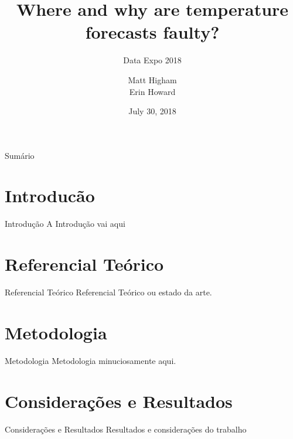 \documentclass[handout,t]{beamer}
\title[Where and why are temperature forecasts faulty?]{Where and why are temperature forecasts faulty?}
\subtitle{Data Expo 2018}
\date{July 30, 2018}
\author[Matt Higham, Erin Howard]{Matt Higham \\ Erin Howard}
\begin{document}

\frame{\titlepage}
\section[]{}
\begin{frame}{Sumário}
  \tableofcontents
\end{frame}


\section{Introducão}
\begin{frame}{Introdução}
A Introdução vai aqui
\end{frame}

\section{Referencial Teórico}
\begin{frame}{Referencial Teórico}
Referencial Teórico ou estado da arte.  
\end{frame}

\section{Metodologia}
\begin{frame}{Metodologia}
Metodologia minuciosamente aqui.
\end{frame}

\section{Considerações e Resultados}
\begin{frame}{Considerações e Resultados}
Resultados e considerações do trabalho  
\end{frame}
\end{document}
